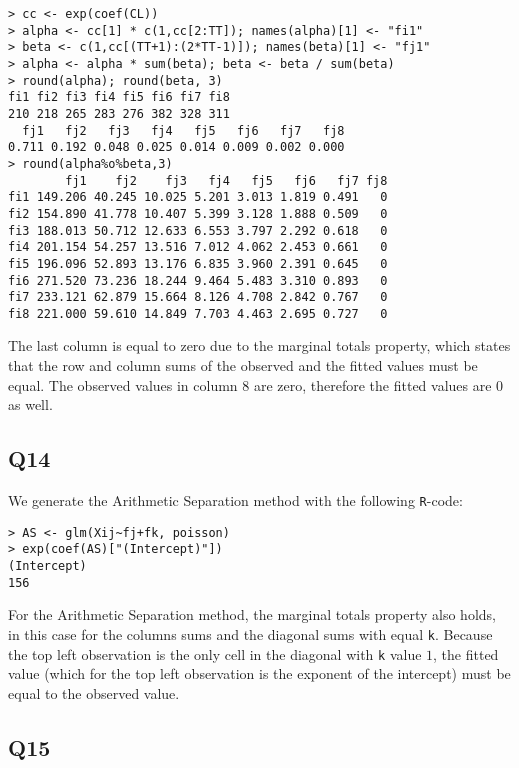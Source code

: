 \documentclass[11pt]{article}
\begin{document}
\begin{verbatim}
> cc <- exp(coef(CL))
> alpha <- cc[1] * c(1,cc[2:TT]); names(alpha)[1] <- "fi1"
> beta <- c(1,cc[(TT+1):(2*TT-1)]); names(beta)[1] <- "fj1"
> alpha <- alpha * sum(beta); beta <- beta / sum(beta)
> round(alpha); round(beta, 3)
fi1 fi2 fi3 fi4 fi5 fi6 fi7 fi8 
210 218 265 283 276 382 328 311 
  fj1   fj2   fj3   fj4   fj5   fj6   fj7   fj8 
0.711 0.192 0.048 0.025 0.014 0.009 0.002 0.000 
> round(alpha%o%beta,3)
        fj1    fj2    fj3   fj4   fj5   fj6   fj7 fj8
fi1 149.206 40.245 10.025 5.201 3.013 1.819 0.491   0
fi2 154.890 41.778 10.407 5.399 3.128 1.888 0.509   0
fi3 188.013 50.712 12.633 6.553 3.797 2.292 0.618   0
fi4 201.154 54.257 13.516 7.012 4.062 2.453 0.661   0
fi5 196.096 52.893 13.176 6.835 3.960 2.391 0.645   0
fi6 271.520 73.236 18.244 9.464 5.483 3.310 0.893   0
fi7 233.121 62.879 15.664 8.126 4.708 2.842 0.767   0
fi8 221.000 59.610 14.849 7.703 4.463 2.695 0.727   0
\end{verbatim}

The last column is equal to zero due to the marginal totals property, which states that the row and column sums of the observed and the fitted values must be equal. The observed values in column $8$ are zero, therefore the fitted values are $0$ as well.

\subsection*{Q14}

We generate the Arithmetic Separation method with the following \verb|R|-code:

\begin{verbatim}
> AS <- glm(Xij~fj+fk, poisson)
> exp(coef(AS)["(Intercept)"])
(Intercept) 
156 
\end{verbatim}

For the Arithmetic Separation method, the marginal totals property also holds, in this case for the columns sums and the diagonal sums with equal \verb|k|. Because the top left observation is the only cell in the diagonal with \verb|k| value $1$, the fitted value (which for the top left observation is the exponent of the intercept) must be equal to the observed value.

\subsection*{Q15}
\end{document}
